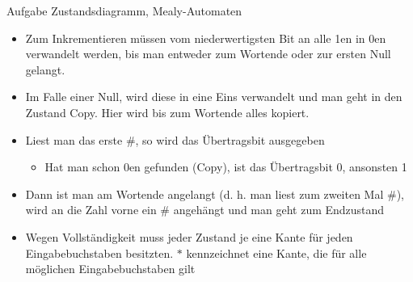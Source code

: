     \begin{frame}[allowframebreaks]{Aufgabe \thesection}{Zustandsdiagramm, Mealy-Automaten}
      \begin{solution}
        \begin{itemize}
          \item Zum Inkrementieren müssen vom niederwertigsten Bit an alle 1en in 0en verwandelt werden, bis man entweder zum Wortende oder zur ersten Null gelangt. 
          \item Im Falle einer Null, wird diese in eine Eins verwandelt und man geht in den Zustand Copy. Hier wird bis zum Wortende alles kopiert. 
          \item Liest man das erste \#, so wird das Übertragsbit ausgegeben
          \begin{itemize}
            \item Hat man schon 0en gefunden (Copy), ist das Übertragsbit 0, ansonsten 1
          \end{itemize}
        \item Dann ist man am Wortende angelangt (d. h. man liest zum zweiten Mal \#), wird an die Zahl vorne ein \# angehängt und man geht zum Endzustand
        \item Wegen Vollständigkeit muss jeder Zustand je eine Kante für jeden Eingabebuchstaben besitzten. $*$ kennzeichnet eine Kante, die für alle möglichen Eingabebuchstaben gilt
        \end{itemize}
      \end{solution}
    \end{frame}

